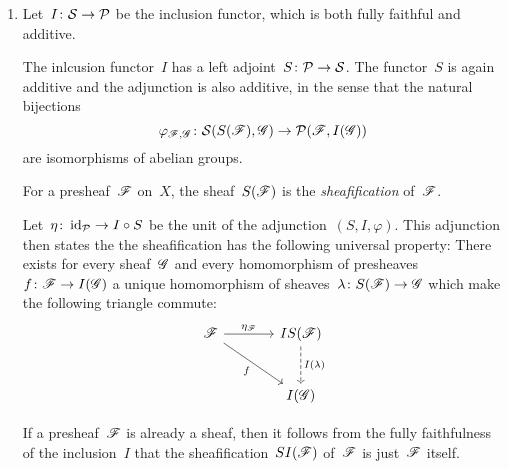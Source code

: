 \begin{example}
\begin{enumerate}
    \item
      Let~$I \colon \mathcal{S} \to \mathcal{P}$ be the inclusion functor, which is both fully faithful and additive.
      
      \begin{fact*}
        The inlcusion functor~$I$ has a left adjoint~$S \colon \mathcal{P} \to \mathcal{S}$.
        The functor~$S$ is again additive and the adjunction is also additive, in the sense that the natural bijections
        \[
                  \varphi_{\mathscr{F},\mathscr{G}}
          \colon  \mathcal{S}(S(\mathscr{F}), \mathscr{G})
          \to     \mathcal{P}(\mathscr{F}, I(\mathscr{G}))
        \]
        are isomorphisms of abelian groups.
      \end{fact*}
      
      \begin{definitionnonum}
        For a presheaf~$\mathscr{F}$ on~$X$, the sheaf~$S(\mathscr{F})$ is the \emph{sheafification} of~$\mathscr{F}$.
      \end{definitionnonum}
      
      Let~$\eta \colon \operatorname{id}_{\mathcal{P}} \to I \circ S$ be the unit of the adjunction~$(S,I,\varphi)$.
      This adjunction then states the the sheafification has the following universal property:      
      There exists for every sheaf~$\mathscr{G}$ and every homomorphism of presheaves~$f \colon \mathscr{F} \to I(\mathscr{G})$ a unique homomorphism of sheaves~$\lambda \colon S(\mathscr{F}) \to \mathscr{G}$ which make the following triangle commute:
      \[
        \begin{tikzcd}[sep = large]
            \sheaf{F}
            \arrow{r}[above]{\eta_{\sheaf{F}}}
            \arrow{dr}[below left]{f}
          & IS(\sheaf{F})
            \arrow[dashed]{d}[right]{I(\lambda)}
          \\
            {}
          & I(\sheaf{G})
        \end{tikzcd}
      \]
      
      If a presheaf~$\mathscr{F}$ is already a sheaf, then it follows from the fully faithfulness of the inclusion~$I$ that the sheafification~$SI(\mathscr{F})$ of~$\mathscr{F}$ is just~$\mathscr{F}$ itself.
      

\end{enumerate}
\end{example}
